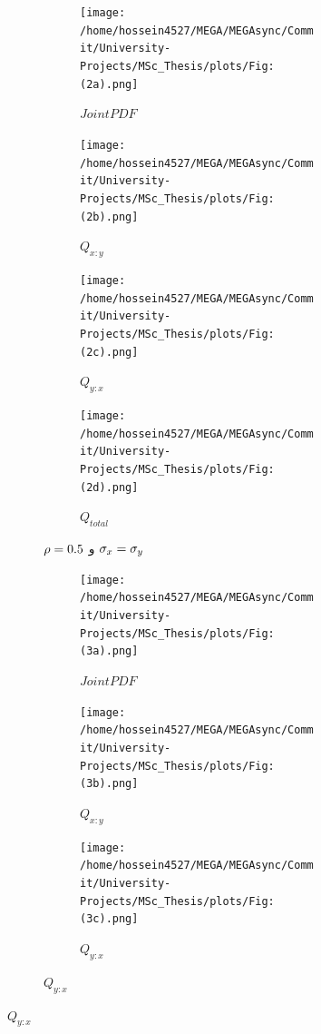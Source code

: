 \documentclass[a4paper,titlepage,12pt,fleqn,oneside]{report}
\begin{document}
\begin{figure}[tbp]
\begin{subfigure}[b]{\textwidth}
\begin{subfigure}[b]{0.24\textwidth}
  			\texttt{[image: /home/hossein4527/MEGA/MEGAsync/Commit/University-Projects/MSc\_Thesis/plots/Fig:(2a).png]}
  			\caption{$Joint PDF$}
  			\label{fig:1.2.1}
  		\end{subfigure}
  		\hfill
  		\begin{subfigure}[b]{0.24\textwidth}
  			\renewcommand\thesubfigure{ii}
  			\centering
  			\texttt{[image: /home/hossein4527/MEGA/MEGAsync/Commit/University-Projects/MSc\_Thesis/plots/Fig:(2b).png]}
  			\caption{$Q_{x:y}$}
  			\label{fig:1.2.2}
  		\end{subfigure}
  		\hfill
  		\begin{subfigure}[b]{0.24\textwidth}
  			\renewcommand\thesubfigure{iii}
  			\centering
  			\texttt{[image: /home/hossein4527/MEGA/MEGAsync/Commit/University-Projects/MSc\_Thesis/plots/Fig:(2c).png]}
  			\caption{$Q_{y:x}$}
  			\label{fig:1.2.3}
  		\end{subfigure}
  		\hfill
  		\begin{subfigure}[b]{0.24\textwidth}
  			\renewcommand\thesubfigure{iv}
  			\centering
  			\texttt{[image: /home/hossein4527/MEGA/MEGAsync/Commit/University-Projects/MSc\_Thesis/plots/Fig:(2d).png]}
  			\caption{$Q_{total}$}
  			\label{fig:1.2.4}
  		\end{subfigure}
  		\caption{$\protect\rho =0.5$ و $\protect\sigma _{x}=\protect\sigma _{y}$}
  		\label{fig:1.2}	
  	\end{subfigure}
  	\begin{subfigure}[b]{\textwidth}
  		\renewcommand\thesubfigure{c}
  		\begin{subfigure}[b]{0.24\textwidth}
  			\renewcommand\thesubfigure{i}
  			\centering
  			\texttt{[image: /home/hossein4527/MEGA/MEGAsync/Commit/University-Projects/MSc\_Thesis/plots/Fig:(3a).png]}
  			\caption{$Joint PDF$}
  			\label{fig:1.3.1}
  		\end{subfigure}
  		\hfill
  		\begin{subfigure}[b]{0.24\textwidth}
  			\renewcommand\thesubfigure{ii}
  			\centering
  			\texttt{[image: /home/hossein4527/MEGA/MEGAsync/Commit/University-Projects/MSc\_Thesis/plots/Fig:(3b).png]}
  			\caption{$Q_{x:y}$}
  			\label{fig:1.3.2}
  		\end{subfigure}
  		\hfill
  		\begin{subfigure}[b]{0.24\textwidth}
  			\renewcommand\thesubfigure{iii}
  			\centering
  			\texttt{[image: /home/hossein4527/MEGA/MEGAsync/Commit/University-Projects/MSc\_Thesis/plots/Fig:(3c).png]}
  			\caption{$Q_{y:x}$}
  			\label{fig:1.3.3}

\end{subfigure}
\end{subfigure}
\end{figure}
\end{document}
